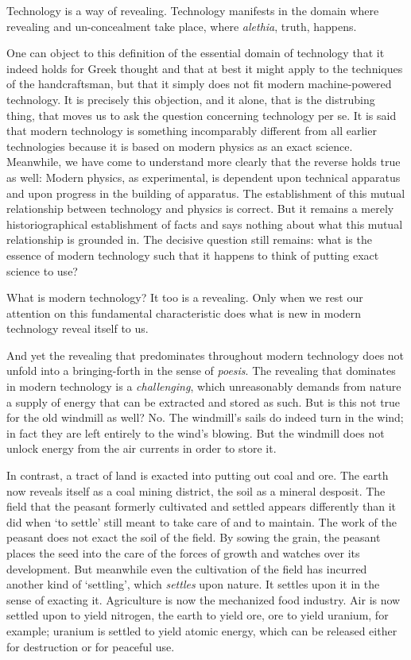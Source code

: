 \documentclass[12pt]{article}
\begin{document}
Technology is a way of revealing. Technology manifests in the domain where revealing and un-concealment take place, where \textit{al{\-e}thia}, truth, happens.

One can object to this definition of the essential domain of technology that it indeed holds for Greek thought and that at best it might apply to the techniques of the handcraftsman, but that it simply does not fit modern machine-powered technology. It is precisely this objection, and it alone, that is the distrubing thing, that moves us to ask the question concerning technology per se. It is said that modern technology is something incomparably different from all earlier technologies because it is based on modern physics as an exact science. Meanwhile, we have come to understand more clearly that the reverse holds true as well: Modern physics, as experimental, is dependent upon technical apparatus and upon progress in the building of apparatus. The establishment of this mutual relationship between technology and physics is correct. But it remains a merely historiographical establishment of facts and says nothing about what this mutual relationship is grounded in. The decisive question still remains: what is the essence of modern technology such that it happens to think of putting exact science to use?

What is modern technology? It too is a revealing. Only when we rest our attention on this fundamental characteristic does what is new in modern technology reveal itself to us. 

And yet the revealing that predominates throughout modern technology does not unfold into a bringing-forth in the sense of \textit{po{\-e}sis}. The revealing that dominates in modern technology is a \textit{challenging}, which unreasonably demands from nature a supply of energy that can be extracted and stored as such. But is this not true for the old windmill as well? No. The windmill's sails do indeed turn in the wind; in fact they are left entirely to the wind's blowing. But the windmill does not unlock energy from the air currents in order to store it.

In contrast, a tract of land is exacted into putting out coal and ore. The earth now reveals itself as a coal mining district, the soil as a mineral desposit. The field that the peasant formerly cultivated and settled appears differently than it did when `to settle' still meant to take care of and to maintain. The work of the peasant does not exact the soil of the field. By sowing the grain, the peasant places the seed into the care of the forces of growth and watches over its development. But meanwhile even the cultivation of the field has incurred another kind of `settling', which \textit{settles} upon nature. It settles upon it in the sense of exacting it. Agriculture is now the mechanized food industry. Air is now settled upon to yield nitrogen, the earth to yield ore, ore to yield uranium, for example; uranium is settled to yield atomic energy, which can be released either for destruction or for peaceful use.
\end{document}
